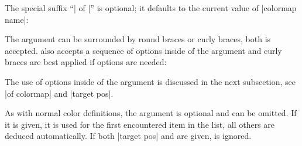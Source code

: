 {\begin{enumerate}
\begin{codeexample}[]
\pgfplotscolorbardrawstandalone[
    colormap={example}{
        samples of colormap=(4 of viridis)
    },
    colorbar horizontal,
    colormap access=map,
]
\end{codeexample}

        The special suffix ``| of |'' is optional; it
        defaults to the current value of |colormap name|:
\begin{codeexample}[]
\pgfplotscolorbardrawstandalone[
    colormap={example}{
        samples of colormap=(4)
    },
    colorbar horizontal,
    colormap access=const,
]
\end{codeexample}

\begin{codeexample}[]
\pgfplotscolorbardrawstandalone[
    colormap={example}{
        samples of colormap=(4)
    },
    colorbar horizontal,
    colormap access=map,
]
\end{codeexample}

        The argument can be surrounded by round braces or curly braces, both is
        accepted. \PGFPlots{} also accepts a sequence of options inside of the
        argument and curly braces are best applied if options are needed:
\begin{codeexample}[]
\pgfplotscolorbardrawstandalone[
    colormap={example}{
        samples of colormap={
            5 of viridis,
            target pos={0,800,850,950,1000},
        }
    },
    colorbar horizontal,
    colormap access=map,
]
\end{codeexample}

\begin{codeexample}[]
\pgfplotscolorbardrawstandalone[
    colormap={example}{
        samples of colormap={
            5 of viridis,
            target pos={0,400,500,700,800,1000},
            sample for=const,
        }
    },
    colorbar horizontal,
    colormap access=const,
]
\end{codeexample}

        The use of options inside of the argument is discussed in the next
        subsection, see |of colormap| and |target pos|.

        As with normal color definitions, the  argument is
        optional and can be omitted. If it is given, it is used for the first
        encountered item in the list, all others are deduced automatically. If
        both |target pos| and  are given,  is
        ignored.


\end{enumerate}}
